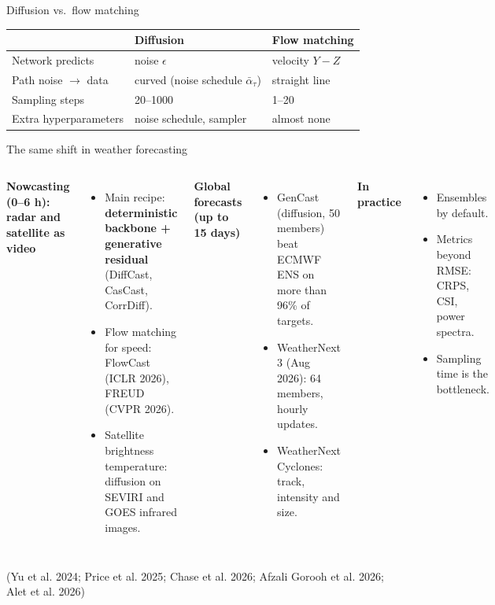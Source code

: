 \documentclass{beamer}
\begin{document}
\begin{frame}{Diffusion vs.\ flow matching}
    \vspace{0.15cm}
    \scriptsize
    \begin{tabular}{@{}lll@{}}
        \toprule
        & \textbf{Diffusion} & \textbf{Flow matching} \\
        \midrule
        Network predicts & noise $\epsilon$ & velocity $Y - Z$ \\
        Path noise $\rightarrow$ data & curved (noise schedule $\bar\alpha_\tau$) & straight line \\
        Sampling steps & 20--1000 & 1--20 \\
        Extra hyperparameters & noise schedule, sampler & almost none \\
        \bottomrule
    \end{tabular}
\end{frame}

\begin{frame}{The same shift in weather forecasting}
    \begin{columns}[t]
        \footnotesize
        \textbf{Nowcasting (0--6 h): radar and satellite as video}
        \begin{itemize}
            \item Main recipe: \textbf{deterministic backbone + generative residual} (DiffCast, CasCast, CorrDiff).
            \item Flow matching for speed: FlowCast (ICLR 2026), FREUD (CVPR 2026).
            \item Satellite brightness temperature: diffusion on SEVIRI and GOES infrared images.
        \end{itemize}

        \footnotesize
        \textbf{Global forecasts (up to 15 days)}
        \begin{itemize}
            \item GenCast (diffusion, 50 members) beat ECMWF ENS on more than 96\% of targets.
            \item WeatherNext 3 (Aug 2026): 64 members, hourly updates.
            \item WeatherNext Cyclones: track, intensity and size.
        \end{itemize}

        \vspace{0.15cm}
        \textbf{In practice}
        \begin{itemize}
            \item Ensembles by default.
            \item Metrics beyond RMSE: CRPS, CSI, power spectra.
            \item Sampling time is the bottleneck.
        \end{itemize}
    \end{columns}

    \vfill
    \hfill{\tiny (Yu et al. 2024; Price et al. 2025; Chase et al. 2026; Afzali Gorooh et al. 2026; Alet et al. 2026)}
\end{frame}
\end{document}
